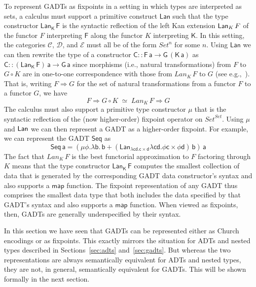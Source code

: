 \documentclass[submission,copyright,creativecommons]{eptcs}
\begin{document}
To represent GADTs as fixpoints in a setting in which types are
interpreted as sets, a calculus must support a primitive construct
$\mathsf{Lan}$ such that the type constructor $\mathsf{Lan_K\,F}$ is
the syntactic reflection of the left Kan extension $\mathsf{Lan}_K \,F$ of the
functor $F$ interpreting $\mathsf{F}$ along the functor $K$
interpreting $\mathsf{K}$. In this setting, the categories
$\mathcal{C}$, $\mathcal{D}$, and $\mathcal{E}$ must all be of the
form $\mathit{Set}^n$ for some $n$. Using $\mathsf{Lan}$ we can then
rewrite the type of a constructor $\mathsf{C :: F\, a \to G\,(K\,a)}$
as $\mathsf{C :: (Lan_K\,F)\,a \to G\,a}$ since morphisms (i.e.,
natural transformations) from $F$ to $G \circ K$ are in one-to-one
correspondence with those from $\mathit{Lan}_K\,F$ to $G$ (see
e.g.,~\cite{rie16}). That is, writing $F \Rightarrow G$ for the set of
natural transformations from a functor $F$ to a functor $G$, we have
\begin{equation}\label{eq:nat-transfs}
F \Rightarrow G \circ K\; \simeq \; Lan_K\,F \Rightarrow G
\end{equation}
The calculus must also support a primitive type
constructor $\mathsf{\mu}$ that is the syntactic reflection of the
(now higher-order) fixpoint operator on
$\mathit{Set}^\mathit{Set}$. Using $\mu$ and $\mathsf{Lan}$ we can then
represent a GADT as a higher-order fixpoint. For example,
we can represent the GADT $\mathsf{Seq}$ as
\[\mathsf{Seq\,a} = \mathsf{(\mu \phi.\lambda b.\, b + (Lan_{\lambda c
    d. c \times d} \lambda c d. \phi c \times \phi d)\,b)\,a}\] The
fact that $Lan_K\,F$ is the best functorial approximation to $F$
factoring through $K$ means that the type constructor
$\mathsf{Lan_K\,F}$ computes the smallest collection of data that is
generated by the corresponding GADT data constructor's syntax and also
supports a $\mathsf{map}$ function. The fixpoint representation of any
GADT thus comprises the smallest data type that both includes the data
specified by that GADT's syntax and also supports a $\mathsf{map}$
function.
When viewed as fixpoints, then,
GADTs are generally underspecified by
their syntax.

\vspace*{0.05in}

In this section we have seen that GADTs can be represented either as
Church encodings or as fixpoints. This exactly mirrors the situation
for ADTs and nested types described in Sections~\ref{sec:adts}
and~\ref{sec:gadts}. But whereas the two representations are always
semantically equivalent for ADTs and nested types, they are not, in
general, semantically equivalent for GADTs. This will be shown
formally in the next section.
\end{document}
